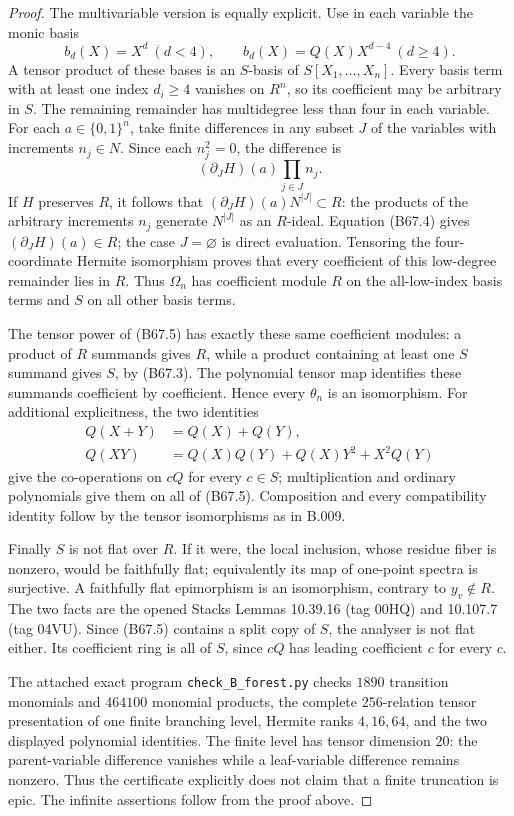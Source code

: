 \begin{proof}
The multivariable version is equally explicit.
Use in each variable the monic basis
\[
 b_d(X)=X^d\ (d<4),\qquad
 b_d(X)=Q(X)X^{d-4}\ (d\ge4).
\]
A tensor product of these bases is an
$S$-basis of $S[X_1,\ldots,X_n]$.
Every basis term with at least one index
$d_i\ge4$ vanishes on $R^n$, so its coefficient
may be arbitrary in $S$. The remaining
remainder has multidegree less than four in
each variable. For each $a\in\{0,1\}^n$,
take finite differences in any subset $J$
of the variables with increments $n_j\in N$.
Since each $n_j^2=0$, the difference is
\[
                      (\partial_J H)(a)\prod_{j\in J}n_j.
\]
If $H$ preserves $R$, it follows that
$(\partial_JH)(a)N^{|J|}\subset R$: the products of the arbitrary increments $n_j$ generate $N^{|J|}$ as an $R$-ideal.
Equation (B67.4) gives $(\partial_JH)(a)\in R$;
the case $J=\varnothing$ is direct evaluation.
Tensoring the four-coordinate Hermite
isomorphism proves that every coefficient
of this low-degree remainder lies in $R$.
Thus $\Omega_n$ has coefficient module $R$
on the all-low-index basis terms and $S$
on all other basis terms.

The tensor power of (B67.5) has exactly these
same coefficient modules: a product of $R$
summands gives $R$, while a product containing
at least one $S$ summand gives $S$, by (B67.3).
The polynomial tensor map identifies these
summands coefficient by coefficient. Hence
every $\theta_n$ is an isomorphism.
For additional explicitness, the two identities
\[
\begin{aligned}
 Q(X+Y)&=Q(X)+Q(Y),\\
 Q(XY)&=Q(X)Q(Y)+Q(X)Y^2+X^2Q(Y)
\end{aligned}
\]
give the co-operations on $cQ$ for every
$c\in S$; multiplication and ordinary
polynomials give them on all of (B67.5).
Composition and every compatibility identity
follow by the tensor isomorphisms as in B.009.

Finally $S$ is not flat over $R$. If it were,
the local inclusion, whose residue fiber is
nonzero, would be faithfully flat; equivalently
its map of one-point spectra is surjective.
A faithfully flat epimorphism is an isomorphism,
contrary to $y_v\notin R$. The two facts are
the opened Stacks Lemmas 10.39.16 (tag 00HQ)
and 10.107.7 (tag 04VU). Since (B67.5)
contains a split copy of $S$, the analyser
is not flat either. Its coefficient ring is
all of $S$, since $cQ$ has leading coefficient
$c$ for every $c$.

The attached exact program \texttt{check\_B\_forest.py}
checks $1890$ transition monomials and $464100$
monomial products, the complete $256$-relation
tensor presentation of one finite branching level,
Hermite ranks $4,16,64$, and the two displayed
polynomial identities. The finite level has tensor
dimension $20$: the parent-variable difference
vanishes while a leaf-variable difference remains
nonzero. Thus the certificate explicitly does
not claim that a finite truncation is epic.
The infinite assertions follow from the proof above.


\end{proof}
